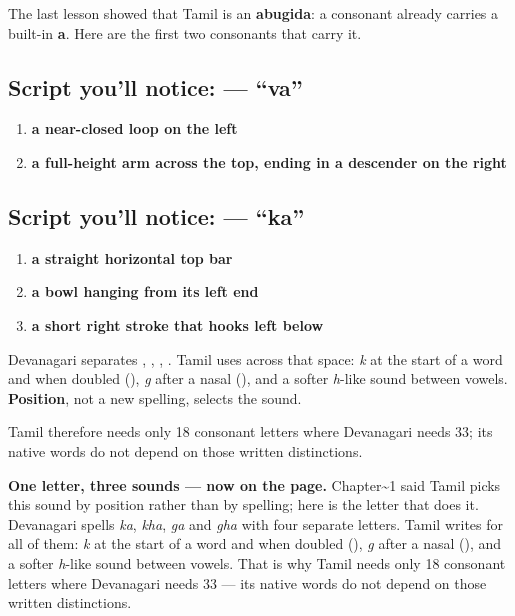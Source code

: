 The last lesson showed that Tamil is an \textbf{abugida}: a consonant already carries a built-in \textbf{a}. Here are the first two consonants that carry it.

\subsection*{Script you'll notice:  — \textquotedblleft{}va\textquotedblright{}}
\begin{enumerate}
\raggedright
  \item \textbf{a near-closed loop on the left}
  \item \textbf{a full-height arm across the top, ending in a descender on the right}
\end{enumerate}

\subsection*{Script you'll notice:  — \textquotedblleft{}ka\textquotedblright{}}
\begin{enumerate}
\raggedright
  \item \textbf{a straight horizontal top bar}
  \item \textbf{a bowl hanging from its left end}
  \item \textbf{a short right stroke that hooks left below}
\end{enumerate}

\begin{sounds}
Devanagari separates , , , . Tamil uses \textbf{} across that space: \emph{k} at the start of a word and when doubled (\textbf{}), \emph{g} after a nasal (\textbf{}), and a softer \emph{h}-like sound between vowels. \textbf{Position}, not a new spelling, selects the sound.

Tamil therefore needs only 18 consonant letters where Devanagari needs 33; its native words do not depend on those written distinctions.
\end{sounds}

\begin{grammarlens}[title={Grammar lens}]
\textbf{One letter, three sounds — now on the page.} Chapter\textasciitilde{}1 said Tamil picks this sound by position rather than by spelling; here is the letter that does it. Devanagari spells \emph{ka}, \emph{kha}, \emph{ga} and \emph{gha} with four separate letters. Tamil writes  for all of them: \emph{k} at the start of a word and when doubled (), \emph{g} after a nasal (), and a softer \emph{h}-like sound between vowels. That is why Tamil needs only 18 consonant letters where Devanagari needs 33 — its native words do not depend on those written distinctions.
\end{grammarlens}

